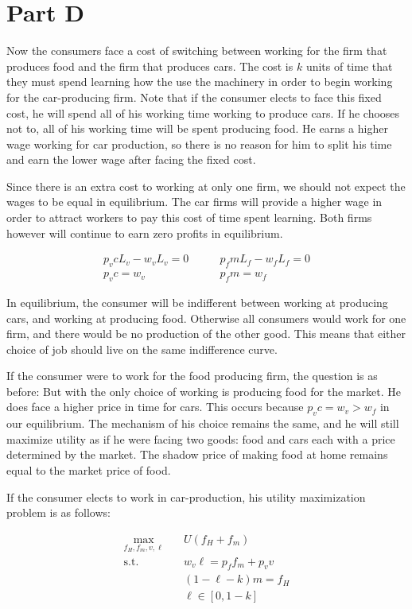 \documentclass[12pt]{paper}
\begin{document}
\section*{Part D}

Now the consumers face a cost of switching between working for the
firm that produces food and the firm that produces cars. The cost is
$k$ units of time that they must spend learning how the use the
machinery in order to begin working for the car-producing firm. Note
that if the consumer elects to face this fixed cost, he will spend all
of his working time working to produce cars. If he chooses not to, all
of his working time will be spent producing food. He earns a higher
wage working for car production, so there is no reason for him to
split his time and earn the lower wage after facing the fixed cost.

Since there is an extra cost to working at only one firm, we should
not expect the wages to be equal in equilibrium. The car firms will
provide a higher wage in order to attract workers to pay this cost of
time spent learning. Both firms however will continue to earn zero
profits in equilibrium.

\begin{align*}
  p_v c L_v - w_v L_v = 0 &\quad \quad p_f m L_f - w_f L_f = 0\\
  p_v c = w_v & \quad \quad p_f m = w_f
\end{align*}

In equilibrium, the consumer will be indifferent between working at
producing cars, and working at producing food. Otherwise all consumers
would work for one firm, and there would be no production of the other
good. This means that either choice of job should live on the same
indifference curve.

If the consumer were to work for the food producing firm, the question
is as before: But with the only choice of working is producing food
for the market. He does face a higher price in time for cars. This
occurs because $p_v c = w_v > w_f$ in our equilibrium. The mechanism
of his choice remains the same, and he will still maximize utility as
if he were facing two goods: food and cars each with a price
determined by the market. The shadow price of making food at home
remains equal to the market price of food.

If the consumer elects to work in car-production, his utility
maximization problem is as follows:

\begin{align*}
\max_{f_H,f_m,v,\ell} \quad &U( f_H + f_m)\\
  \text{s.t.} \quad & w_v \ell = p_f f_{m} + p_v v\\
                & (1 - \ell - k)m = f_H\\
                & \ell \in [0,1-k]
\end{align*}
\end{document}
